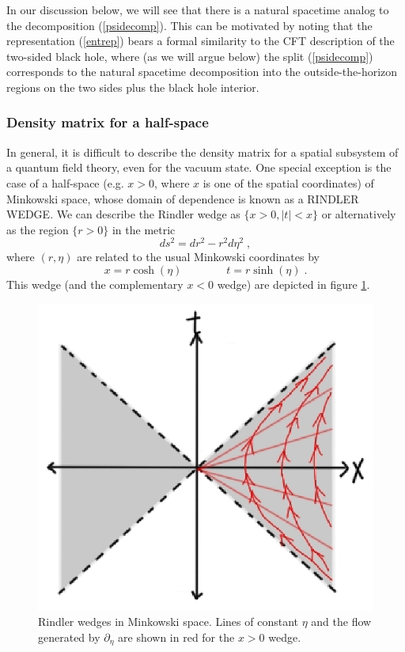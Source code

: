 \documentclass[12pt,epsf]{article}
\newcommand{\be}{\begin{equation}}
\newcommand{\ee}{\end{equation}}
\begin{document}
In our discussion below, we will see that there is a natural spacetime analog to the decomposition (\ref{psidecomp}). This can be motivated by noting that the representation (\ref{entrep}) bears a formal similarity to the CFT description of the two-sided black hole, where (as we will argue below) the split (\ref{psidecomp}) corresponds to the natural spacetime decomposition into the outside-the-horizon regions on the two sides plus the black hole interior.

\subsubsection*{Density matrix for a half-space}

In general, it is difficult to describe the density matrix for a spatial subsystem of a quantum field theory, even for the vacuum state. One special exception is the case of a half-space (e.g. $x > 0$, where $x$ is one of the spatial coordinates) of Minkowski space, whose domain of dependence is known as a RINDLER WEDGE. We can describe the Rindler wedge as $\{x > 0, |t| < x\}$ or alternatively as the region $\{r > 0\}$ in the metric
\be
ds^2 = dr^2 - r^2 d \eta^2 \; ,
\ee
where $(r,\eta)$ are related to the usual Minkowski coordinates by
\be
x = r \cosh(\eta) \qquad \qquad t = r \sinh(\eta) \; .
\ee
This wedge (and the complementary $x < 0$ wedge) are depicted in figure \ref{Rindler}.

\begin{figure}
\centering
\includegraphics[width = 0.4 \textwidth]{Rindler.eps}
\caption{Rindler wedges in Minkowski space. Lines of constant $\eta$ and the flow generated by $\partial_\eta$ are shown in red for the $x > 0$ wedge.}
\label{Rindler}
\end{figure}
\end{document}
